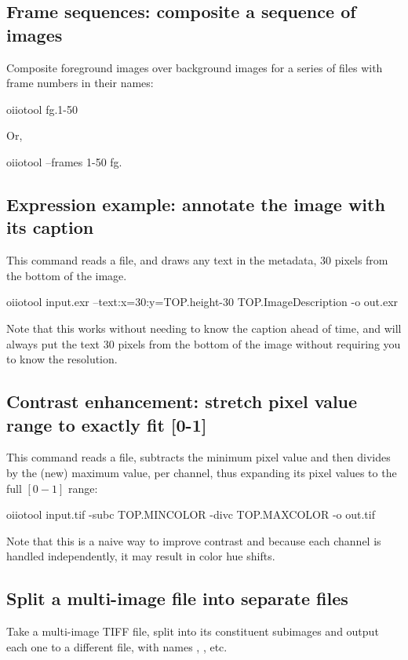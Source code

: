 \subsection*{Frame sequences: composite a sequence of images}

\noindent Composite foreground images over background images for a
series of files with frame numbers in their names:
\begin{code}
    oiiotool fg.1-50%
\end{code}

\noindent Or,
\begin{code}
    oiiotool --frames 1-50 fg.%
\end{code}


\subsection*{Expression example: annotate the image with its caption}

\noindent This command reads a file, and draws any text in the
 metadata, 30 pixels from the bottom of the image.
\begin{code}
    oiiotool input.exr --text:x=30:y={TOP.height-30} {TOP.ImageDescription} -o out.exr
\end{code}
\noindent Note that this works without needing to know the caption ahead
of time, and will always put the text 30 pixels from the bottom of the image
without requiring you to know the resolution.


\subsection*{Contrast enhancement: stretch pixel value range to exactly fit [0-1]}
\noindent This command reads a file, subtracts the minimum pixel value and
then divides by the (new) maximum value, per channel, thus expanding its
pixel values to the full $[0-1]$ range:
\begin{code}
    oiiotool input.tif -subc {TOP.MINCOLOR} -divc {TOP.MAXCOLOR} -o out.tif
\end{code}
\noindent Note that this is a naive way to improve contrast and because
each channel is handled independently, it may result in color hue shifts.


\subsection{Split a multi-image file into separate files}
\noindent Take a multi-image TIFF file, split into its constituent subimages
and output each one to a different file, with names ,
, etc.

